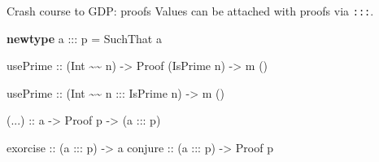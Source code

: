 \documentclass[
  9pt,
  ignorenonframetext,
]{beamer}
\newenvironment{Shaded}{}{}
\newcommand{\DataTypeTok}[1]{\textcolor[rgb]{0.56,0.13,0.00}{#1}}
\newcommand{\KeywordTok}[1]{\textcolor[rgb]{0.00,0.44,0.13}{\textbf{#1}}}
\newcommand{\NormalTok}[1]{#1}
\newcommand{\OperatorTok}[1]{\textcolor[rgb]{0.40,0.40,0.40}{#1}}
\newcommand{\OtherTok}[1]{\textcolor[rgb]{0.00,0.44,0.13}{#1}}
\begin{document}
\begin{frame}[fragile]{Crash course to GDP: proofs}
\protect\hypertarget{crash-course-to-gdp-proofs-1}{}
Values can be attached with proofs via \texttt{:::}.

\begin{Shaded}
\begin{Highlighting}[]
\KeywordTok{newtype}\NormalTok{ a }\OperatorTok{:::}\NormalTok{ p }\OtherTok{=} \DataTypeTok{SuchThat}\NormalTok{ a}

\NormalTok{usePrime }
\OtherTok{  ::}\NormalTok{ (}\DataTypeTok{Int} \OperatorTok{\textasciitilde{}\textasciitilde{}}\NormalTok{ n)}
  \OtherTok{{-}\textgreater{}} \DataTypeTok{Proof}\NormalTok{ (}\DataTypeTok{IsPrime}\NormalTok{ n)}
  \OtherTok{{-}\textgreater{}}\NormalTok{ m ()}

\NormalTok{usePrime}
\OtherTok{  ::}\NormalTok{ (}\DataTypeTok{Int} \OperatorTok{\textasciitilde{}\textasciitilde{}}\NormalTok{ n }\OperatorTok{:::} \DataTypeTok{IsPrime}\NormalTok{ n)}
  \OtherTok{{-}\textgreater{}}\NormalTok{ m ()}

\OtherTok{(...)  ::}\NormalTok{ a }\OtherTok{{-}\textgreater{}} \DataTypeTok{Proof}\NormalTok{ p }\OtherTok{{-}\textgreater{}}\NormalTok{ (a }\OperatorTok{:::}\NormalTok{ p)}

\OtherTok{exorcise ::}\NormalTok{ (a }\OperatorTok{:::}\NormalTok{ p) }\OtherTok{{-}\textgreater{}}\NormalTok{ a}
\OtherTok{conjure  ::}\NormalTok{ (a }\OperatorTok{:::}\NormalTok{ p) }\OtherTok{{-}\textgreater{}} \DataTypeTok{Proof}\NormalTok{ p}
\end{Highlighting}
\end{Shaded}








\end{frame}
\end{document}
